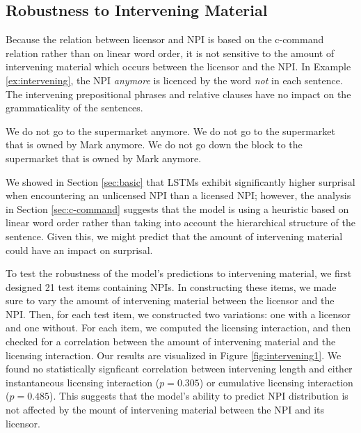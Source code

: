 \documentclass[11pt, round]{article}
\begin{document}
\subsection{Robustness to Intervening Material}
\label{sec:intervening}
Because the relation between licensor and NPI is based on the c-command relation rather than on linear word order, it is not sensitive to the amount of intervening material which occurs between the licensor and the NPI. In Example \ref{ex:intervening}, the NPI \textit{anymore} is licenced by the word \textit{not} in each sentence. The intervening prepositional phrases and relative clauses have no impact on the grammaticality of the sentences.
\begin{exe}
\ex \label{ex:intervening}
\begin{xlist}
\ex We do not go to the supermarket anymore.
\ex We do not go to the supermarket that is owned by Mark anymore.
\ex We do not go down the block to the supermarket that is owned by Mark anymore. 
\end{xlist}
\end{exe}
We showed in Section \ref{sec:basic} that LSTMs exhibit significantly higher surprisal when encountering an unlicensed NPI than a licensed NPI; however, the analysis in Section \ref{sec:c-command} suggests that the model is using a heuristic based on linear word order rather than taking into account the hierarchical structure of the sentence. Given this, we might predict that the amount of intervening material could have an impact on surprisal. 

To test the robustness of the model's predictions to intervening material, we first designed 21 test items containing NPIs. In constructing these items, we made sure to vary the amount of intervening material between the licensor and the NPI. Then, for each test item, we constructed two variations: one with a licensor and one without. For each item, we computed the licensing interaction, and then checked for a correlation between the amount of intervening material and the licensing interaction. Our results are visualized in Figure \ref{fig:intervening1}. We found no statistically signficant correlation between intervening length and either instantaneous licensing interaction ($p = 0.305$) or cumulative licensing interaction ($p = 0.485$). This suggests that the model's ability to predict NPI distribution is not affected by the mount of intervening material between the NPI and its licensor.
\end{document}
